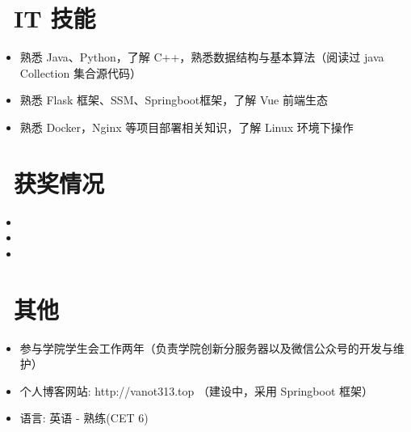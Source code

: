 \documentclass{resume}
\begin{document}
  \section{\faCogs\ IT 技能}
  \begin{itemize}[parsep=0.5ex]
    \item 熟悉 Java、Python，了解 C++，熟悉数据结构与基本算法（阅读过 java Collection 集合源代码）
    \item 熟悉 Flask 框架、SSM、Springboot框架，了解 Vue 前端生态
    \item 熟悉 Docker，Nginx 等项目部署相关知识，了解 Linux 环境下操作
  \end{itemize}

  \section{\faHeartO\ 获奖情况}
  \begin{itemize}[parsep=0.5ex]
    \item {}
    \item {}
    \item {}
  \end{itemize}

  \section{\faInfo\ 其他}
  \begin{itemize}[parsep=0.5ex]
    \item 参与学院学生会工作两年（负责学院创新分服务器以及微信公众号的开发与维护）
    \item 个人博客网站: http://vanot313.top （建设中，采用 Springboot 框架）
    \item 语言: 英语 - 熟练(CET 6)
  \end{itemize}
  
\end{document}
